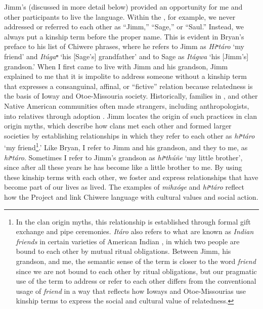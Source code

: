 \documentclass[output=paper]{LSP/langsci}
\begin{document}
Jimm's  (discussed in more detail below) provided an opportunity for me and other participants to live the language. Within the , for example, we never addressed or referred to each other as ``Jimm,'' ``Sage,'' or ``Saul.'' Instead, we always put a kinship term before the proper name. This is evident in Bryan's preface to his list of Chiwere phrases, where he refers to Jimm as \emph{Hiⁿtáro} `my friend' and \emph{Itúgaⁿ} `his [Sage's] grandfather' and to Sage as \emph{Itágwa} `his [Jimm's] grandson.' When I first came to live with Jimm and his grandson, Jimm explained to me that it is impolite to address someone without a kinship term that expresses a consanguinal, affinal, or ``fictive'' relation because relatedness is the basis of Ioway and Otoe-Missouria society. Historically, families in , and other Native American communities often made strangers, including anthropologists, into relatives through adoption \citep[see e.g.][]{Kan2001}. Jimm locates the origin of such practices in clan origin myths, which describe how clans met each other and formed larger societies by establishing relationships in which they refer to each other as \emph{hiⁿtáro} `my friend\footnote{In the clan origin myths, this relationship is established through formal gift exchange and pipe ceremonies. \emph{Itáro} also refers to what are known as \emph{Indian friends} in certain varieties of American Indian , in which two people are bound to each other by mutual ritual obligations. Between Jimm, his grandson, and me, the semantic sense of the term is closer to the  word \emph{friend} since we are not bound to each other by ritual obligations, but our pragmatic use of the term to address or refer to each other differs from the conventional  usage of \emph{friend} in a way that reflects how Ioways and Otoe-Missourias use kinship terms to express the social and cultural value of relatedness.}.' Like Bryan, I refer to Jimm and his grandson, and they to me, as \emph{hiⁿtáro}. Sometimes I refer to Jimm's grandson as \emph{hiⁿthúñe} `my little brother', since after all these years he has become like a little brother to me. By using these kinship terms with each other, we foster and express relationships that have become part of our lives as lived. The examples of \emph{mihxóge} and \emph{hiⁿtáro} reflect how the Project and  link Chiwere language with cultural values and social action.
\end{document}
